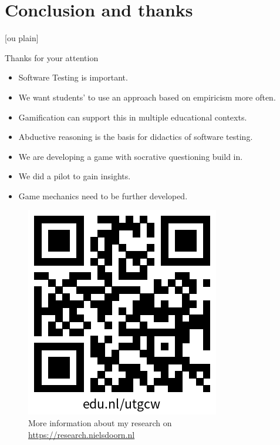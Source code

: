 \documentclass[aspectratio=169]{beamer}
\begin{document}
\section{Conclusion and thanks}


[ou plain]
\begin{frame}{Thanks for your attention}

\begin{itemize}
    \item Software Testing is important.
    \item We want students' to use an approach based on empiricism more often.
    \item Gamification can support this in multiple educational contexts.
    \item Abductive reasoning is the basis for didactics of software testing.
    \item We are developing a game with socrative questioning build in.
    \item We did a pilot to gain insights.
    \item Game mechanics need to be further developed.
\end{itemize}


\begin{figure}
    \centering
    \includegraphics[width=0.25\linewidth]{images//qr.png}
    \caption{More information about my research on \url{https://research.nielsdoorn.nl}}
\end{figure}
\end{frame}
\end{document}
